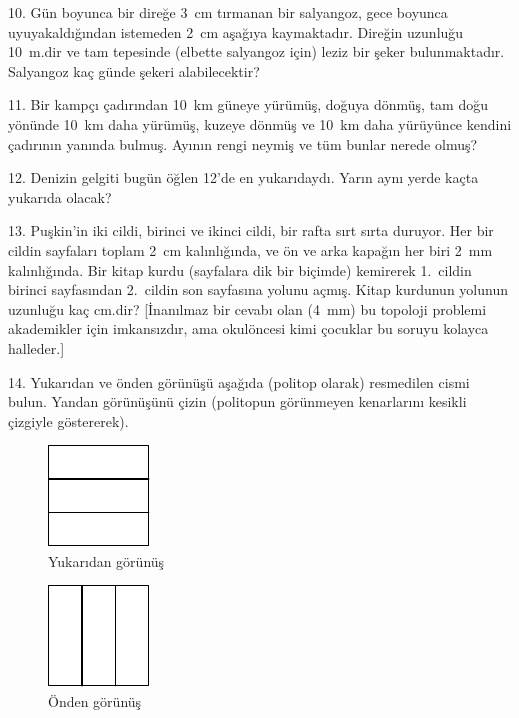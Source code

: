 \begin{problem}{10.}
Gün boyunca bir direğe \SI{3}{\cm} tırmanan bir salyangoz, gece bo\-yun\-ca uyuyakaldığından istemeden \SI{2}{\cm} aşağıya kaymaktadır. Direğin u\-zun\-lu\-ğu \SI{10}{\metre}.dir ve tam tepesinde (elbette salyangoz için) leziz bir şeker bu\-lun\-mak\-ta\-dır. Salyangoz kaç günde şekeri alabilecektir?
\end{problem}

\begin{problem}{11.}
Bir kampçı çadırından \SI{10}{\km} güneye yürümüş, doğuya dönmüş, tam doğu yönünde \SI{10}{\km} daha yürümüş, kuzeye dönmüş ve \SI{10}{\km} daha yürüyünce kendini çadırının yanında bulmuş. Ayının rengi neymiş ve tüm bunlar nerede olmuş?
\end{problem}

\begin{problem}{12.}
Denizin gelgiti bugün öğlen 12'de en yukarıdaydı. Yarın aynı yerde kaçta yukarıda olacak?
\end{problem}

\begin{problem}{13.}
Puşkin'in iki cildi, birinci ve ikinci cildi, bir rafta sırt sırta duruyor. Her bir cildin sayfaları toplam \SI{2}{\cm} kalınlığında, ve ön ve arka kapağın her biri \SI{2}{\mm} kalınlığında. Bir kitap kurdu (sayfalara dik bir biçimde) kemirerek 1.~cildin birinci sayfasından 2.~cildin son sayfasına yolunu açmış. Kitap kurdunun yolunun uzunluğu kaç cm.dir? [İnanılmaz bir cevabı olan (4~mm) bu topoloji problemi akademikler için imkansızdır, ama okulöncesi kimi çocuklar bu soruyu kolayca halleder.]
\end{problem}

\begin{problem}{14.}
Yukarıdan ve önden görünüşü aşağıda  (politop olarak) resmedilen  cismi bulun. Yandan görünüşünü çizin (politopun görünmeyen ke\-nar\-la\-rı\-nı kesikli çizgiyle göstererek).
	\begin{figure}
		\footnotesize
		\null\hfill
		\parbox{0.2\linewidth}{\centering\includegraphics{resources/taskbook-99}\\ Yukarıdan görünüş}
		\hfill
		\parbox{0.2\linewidth}{\centering\includegraphics{resources/taskbook-98}\\ Önden görünüş}
		\hfill\null
	\end{figure}
\end{problem}

